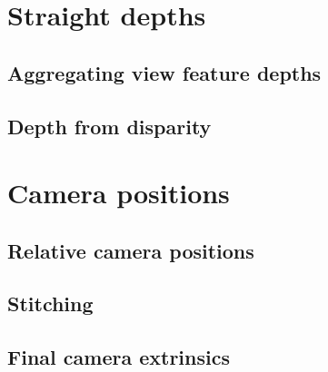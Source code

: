 \documentclass{scrreprt}
\begin{document}
\section{Straight depths}

\subsection{Aggregating view feature depths}

\subsection{Depth from disparity}

\section{Camera positions}

\subsection{Relative camera positions}

\subsection{Stitching}

\subsection{Final camera extrinsics}
 
\end{document}

